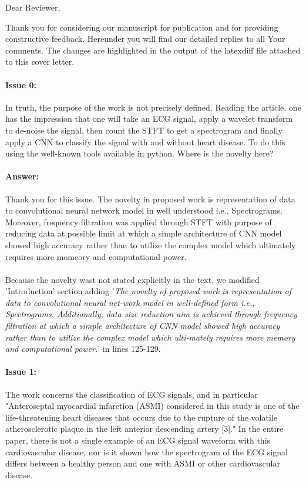 \documentclass{article}
\begin{document}
Dear Reviewer,

\vspace{0.25in}

Thank you for considering our manuscript for publication and for providing constructive feedback.
Hereunder you will find our detailed replies to all Your comments.
The changes are highlighted in the output of the latexdiff file attached to this cover letter.


\paragraph{Issue 0:}
\begin{displayquote}
In truth, the purpose of the work is not precisely defined. Reading the article, one has the impression that one will take an ECG signal, apply a wavelet transform to de-noise the signal, then count the STFT to get a spectrogram and finally apply a CNN to classify the signal with and without heart disease. To do this using the well-known tools available in python. Where is the novelty here?
\end{displayquote}

\paragraph{Answer:}
Thank you for this issue. The novelty in proposed work is representation of data to convolutional neural network model in well understood i.e., Spectrograms. Moreover,  frequency filtration was applied through STFT with purpose of reducing data at possible limit at which a simple architecture of CNN model showed high accuracy rather than to utilize the complex model which ultimately requires more momeory and computational power.\\\\

Because the novelty wast not stated explicitly in the text, we modified 'Introduction' section adding '\textit{The novelty of proposed work is representation of data to convolutional neural net-work model in well-defined form i.e., Spectrograms. Additionally, data size reduction aim is achieved through frequency filtration at which a simple architecture of CNN model showed high accuracy rather than to utilize the complex model which ulti-mately requires more memory and computational power.}' in lines 125-129.

\paragraph{Issue 1:}
\begin{displayquote}
The work concerns the classification of ECG signals, and in particular "Anteroseptal myocardial infarction (ASMI) considered in this study is one of the life-threatening heart diseases that occurs due to the rupture of the volatile atherosclerotic plaque in the left anterior descending artery [3]." In the entire paper, there is not a single example of an ECG signal waveform with this cardiovascular disease, nor is it shown how the spectrogram of the ECG signal differs between a healthy person and one with ASMI or other cardiovascular disease.
\end{displayquote}
\end{document}
